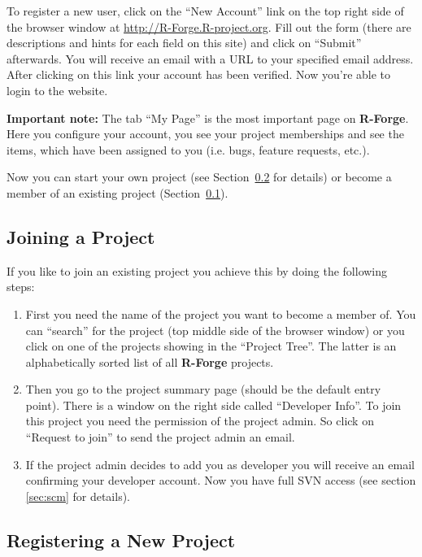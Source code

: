 \documentclass[a4paper]{report}
\begin{document}
To register a new user, click on the ``New Account'' link on the top
right side of the browser window at \url{http://R-Forge.R-project.org}.
Fill out the form (there are descriptions and hints for each field on
this site) and click on ``Submit'' afterwards. You will receive an
email with
a URL to your specified email address. After clicking on this link
your account has been verified. Now you're able to login to the
website.
\newline

\textbf{Important note:} The tab ``My Page'' is the most important
page on \textbf{R-Forge}. Here you configure your account, you see your
project memberships and see the items, which have been assigned to you
(i.e. bugs, feature requests, etc.).
\newline

Now you can start your own project (see Section~\ref{sec:newproject}
for details) or become a member of an existing project
(Section~\ref{sec:joinproject}). 

\subsection{Joining a Project}
\label{sec:joinproject}
If you like to join an existing project you achieve this by doing the
following steps:
\begin{enumerate}
\item First you need the name of the project you want to become a
  member of. You can ``search'' for the project (top middle side of the
  browser window) or you click on one of the projects showing in the
  ``Project Tree''. The latter is an alphabetically sorted list of all
  \textbf{R-Forge} projects.
\item Then you go to the project summary page (should be the default
  entry point). There is a window on the right side called
  ``Developer Info''. To join this project you need the permission of
  the project admin. So click on ``Request to join'' to send the
  project admin an email.
\item If the project admin decides to add you as developer you will
  receive an email confirming your developer account. Now you have
  full SVN access (see section \ref{sec:scm} for details).
\end{enumerate}

\subsection{Registering a New Project}
\label{sec:newproject}
\end{document}
